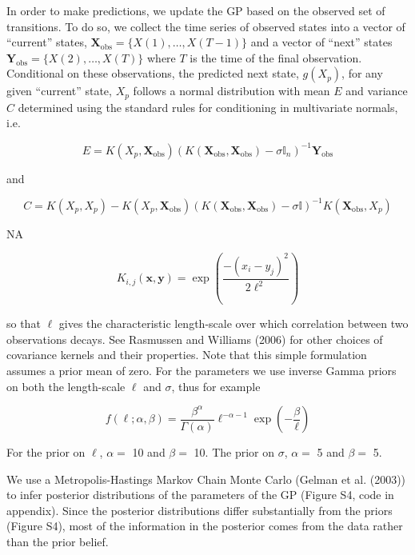 \documentclass[author-year, 12pt,review]{components/elsarticle} %
\begin{document}
In order to make predictions, we update the GP based on the observed set
of transitions. To do so, we collect the time series of observed states
into a vector of ``current'' states,
\(\mathbf{X}_{\textrm{obs}} = \{X(1), \dots, X(T-1)\}\) and a vector of
``next'' states \(\mathbf{Y}_{\textrm{obs}} = \{X(2),\dots,X(T)\}\)
where \(T\) is the time of the final observation. Conditional on these
observations, the predicted next state, \(g(X_p)\), for any given
``current'' state, \(X_p\) follows a normal distribution with mean \(E\)
and variance \(C\) determined using the standard rules for conditioning
in multivariate normals, i.e.

\begin{equation}
E = K(X_p, \mathbf{X}_{\textrm{obs}}) \left(K(\mathbf{X}_{\textrm{obs}},\mathbf{X}_{\textrm{obs}}) - \sigma \mathbb{I}_n \right)^{-1} \mathbf{Y}_{\textrm{obs}}
\end{equation}

and

\begin{equation}
C = K(X_p, X_p) - K(X_p, \mathbf{X}_{\textrm{obs}}) \left(K(\mathbf{X}_{\textrm{obs}},\mathbf{X}_{\textrm{obs}}) - \sigma \mathbb{I} \right)^{-1} K(\mathbf{X}_{\textrm{obs}}, X_p)
\end{equation}

NA

\begin{equation}
K_{i,j}(\mathbf{x}, \mathbf{y}) = \exp\left( \frac{ -(x_i - y_j)^2}{2 \ell^2} \right)
\end{equation}

so that \(\ell\) gives the characteristic length-scale over which
correlation between two observations decays. See Rasmussen and Williams
(2006) for other choices of covariance kernels and their properties.
Note that this simple formulation assumes a prior mean of zero. For the
parameters we use inverse Gamma priors on both the length-scale \(\ell\)
and \(\sigma\), thus for example

\begin{equation}
f(\ell; \alpha, \beta) = \frac{\beta^\alpha}{\Gamma(\alpha)} \ell^{-\alpha - 1}\exp\left(-\frac{\beta}{\ell}\right)
\end{equation}

For the prior on \(\ell\), \(\alpha =\) 10 and \(\beta =\) 10. The prior
on \(\sigma\), \(\alpha =\) 5 and \(\beta =\) 5.

We use a Metropolis-Hastings Markov Chain Monte Carlo (Gelman et al.
(2003)) to infer posterior distributions of the parameters of the GP
(Figure S4, code in appendix). Since the posterior distributions differ
substantially from the priors (Figure S4), most of the information in
the posterior comes from the data rather than the prior belief.
\end{document}

